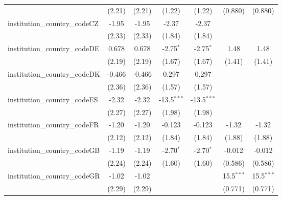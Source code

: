 \begin{tabular}{lcccccc}
                                         & (2.21)        & (2.21)        & (1.22)        & (1.22)        & (0.880)       & (0.880)\\   
   institution\_country\_codeCZ          & -1.95         & -1.95         & -2.37         & -2.37         &               &   \\   
                                         & (2.33)        & (2.33)        & (1.84)        & (1.84)        &               &   \\   
   institution\_country\_codeDE          & 0.678         & 0.678         & -2.75$^{*}$   & -2.75$^{*}$   & 1.48          & 1.48\\   
                                         & (2.19)        & (2.19)        & (1.67)        & (1.67)        & (1.41)        & (1.41)\\   
   institution\_country\_codeDK          & -0.466        & -0.466        & 0.297         & 0.297         &               &   \\   
                                         & (2.36)        & (2.36)        & (1.57)        & (1.57)        &               &   \\   
   institution\_country\_codeES          & -2.32         & -2.32         & -13.5$^{***}$ & -13.5$^{***}$ &               &   \\   
                                         & (2.27)        & (2.27)        & (1.98)        & (1.98)        &               &   \\   
   institution\_country\_codeFR          & -1.20         & -1.20         & -0.123        & -0.123        & -1.32         & -1.32\\   
                                         & (2.12)        & (2.12)        & (1.84)        & (1.84)        & (1.88)        & (1.88)\\   
   institution\_country\_codeGB          & -1.19         & -1.19         & -2.70$^{*}$   & -2.70$^{*}$   & -0.012        & -0.012\\   
                                         & (2.24)        & (2.24)        & (1.60)        & (1.60)        & (0.586)       & (0.586)\\   
   institution\_country\_codeGR          & -1.02         & -1.02         &               &               & 15.5$^{***}$  & 15.5$^{***}$\\   
                                         & (2.29)        & (2.29)        &               &               & (0.771)       & (0.771)\\   

\end{tabular}
